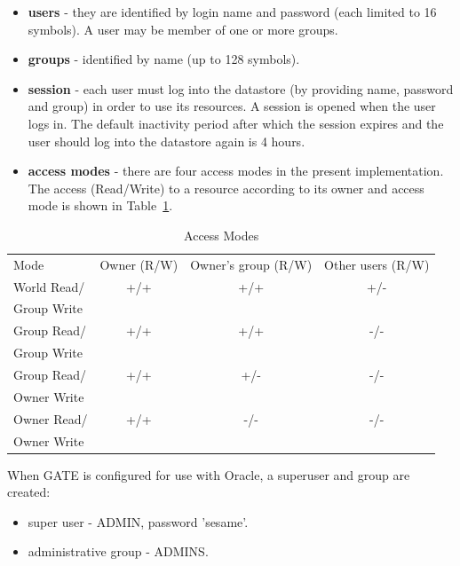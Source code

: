 \begin{itemize}
    \item {\bf users} - they are identified by login name and password (each limited to 16 symbols).
    A user may be member of one or more groups.
    \item {\bf groups} - identified by name (up to 128 symbols).
    \item {\bf session} - each user must log into the datastore (by providing name, password and group) in order to use its resources.
    A session is opened when the user logs in. The default inactivity period after which the session expires and the user
    should log into the datastore again is 4 hours.
    \item {\bf access modes} -  there are four access modes in the present implementation.
    The access (Read/Write) to a resource
    according to its owner and access mode is shown in Table~\ref{table:access_modes}.
\end{itemize}

\begin{table}[htbp]
\begin{tabular} {|l|c|c|c|} \hline
Mode&Owner (R/W)& Owner's group (R/W) &Other users (R/W)\\
\cline{1-4}
World Read/ & +/+ & +/+ & +/- \\
Group Write & & & \\ \cline{1-4}
Group Read/ & +/+ & +/+ & -/- \\
Group Write & & & \\ \cline{1-4}
Group Read/ & +/+ & +/- & -/- \\
Owner Write & & & \\ \cline{1-4}
Owner Read/ & +/+ & -/- & -/- \\
Owner Write & & & \\ \cline{1-4}

\end{tabular}
\caption{Access Modes}
\label{table:access_modes}
\end{table}


When GATE is configured for use with Oracle, a superuser and group
are created:

\begin{itemize}
    \item super user - ADMIN, password  'sesame'.
    \item administrative group - ADMINS.
\end{itemize}

